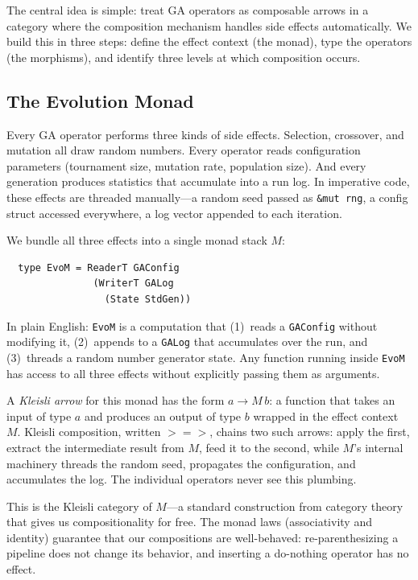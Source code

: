 \documentclass[sigconf,anonymous]{acmart}
\begin{document}
The central idea is simple: treat GA operators as composable arrows in a category where the composition mechanism handles side effects automatically. We build this in three steps: define the effect context (the monad), type the operators (the morphisms), and identify three levels at which composition occurs.

\subsection{The Evolution Monad}

Every GA operator performs three kinds of side effects. Selection, crossover, and mutation all draw random numbers. Every operator reads configuration parameters (tournament size, mutation rate, population size). And every generation produces statistics that accumulate into a run log. In imperative code, these effects are threaded manually---a random seed passed as \texttt{\&mut rng}, a config struct accessed everywhere, a log vector appended to each iteration.

We bundle all three effects into a single monad stack $M$:

\begin{verbatim}
  type EvoM = ReaderT GAConfig
               (WriterT GALog
                 (State StdGen))
\end{verbatim}

\noindent In plain English: \texttt{EvoM} is a computation that (1)~reads a \texttt{GAConfig} without modifying it, (2)~appends to a \texttt{GALog} that accumulates over the run, and (3)~threads a random number generator state. Any function running inside \texttt{EvoM} has access to all three effects without explicitly passing them as arguments.

A \emph{Kleisli arrow} for this monad has the form $a \to M\,b$: a function that takes an input of type $a$ and produces an output of type $b$ wrapped in the effect context $M$. Kleisli composition, written $\mathbin{>\!\!=\!\!>}$, chains two such arrows: apply the first, extract the intermediate result from $M$, feed it to the second, while $M$'s internal machinery threads the random seed, propagates the configuration, and accumulates the log. The individual operators never see this plumbing.

This is the Kleisli category of $M$---a standard construction from category theory~\cite{maclane1971categories, moggi1991notions} that gives us compositionality for free. The monad laws (associativity and identity) guarantee that our compositions are well-behaved: re-parenthesizing a pipeline does not change its behavior, and inserting a do-nothing operator has no effect.
\end{document}
